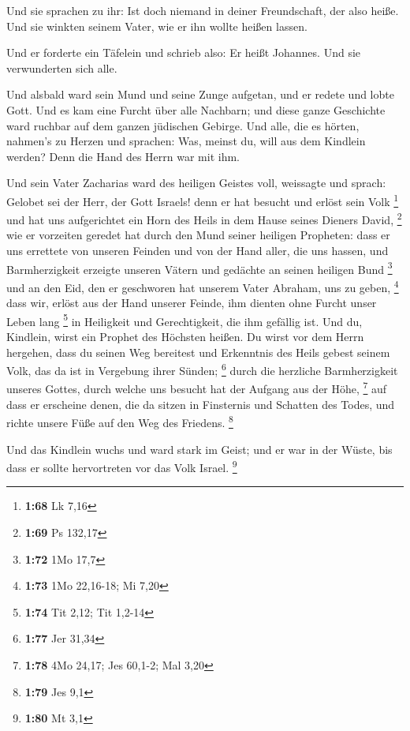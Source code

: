  Und sie sprachen zu ihr: Ist doch niemand in deiner
Freundschaft, der also heiße.  Und sie winkten seinem
Vater, wie er ihn wollte heißen lassen.

 Und er forderte ein Täfelein und schrieb also: Er heißt
Johannes. Und sie verwunderten sich alle.

 Und alsbald ward sein Mund und seine Zunge aufgetan, und
er redete und lobte Gott.  Und es kam eine Furcht über
alle Nachbarn; und diese ganze Geschichte ward ruchbar auf dem ganzen
jüdischen Gebirge.  Und alle, die es hörten, nahmen's zu
Herzen und sprachen: Was, meinst du, will aus dem Kindlein werden? Denn
die Hand des Herrn war mit ihm.

 Und sein Vater Zacharias ward des heiligen Geistes voll,
weissagte und sprach:  Gelobet sei der Herr, der Gott
Israels! denn er hat besucht und erlöst sein Volk \footnote{\textbf{1:68}
  Lk 7,16}  und hat uns aufgerichtet ein Horn des Heils
in dem Hause seines Dieners David, \footnote{\textbf{1:69} Ps 132,17}
 wie er vorzeiten geredet hat durch den Mund seiner
heiligen Propheten:  dass er uns errettete von unseren
Feinden und von der Hand aller, die uns hassen,  und
Barmherzigkeit erzeigte unseren Vätern und gedächte an seinen heiligen
Bund \footnote{\textbf{1:72} 1Mo 17,7}  und an den Eid,
den er geschworen hat unserem Vater Abraham, uns zu geben, \footnote{\textbf{1:73}
  1Mo 22,16-18; Mi 7,20}  dass wir, erlöst aus der Hand
unserer Feinde, ihm dienten ohne Furcht unser Leben lang \footnote{\textbf{1:74}
  Tit 2,12; Tit 1,2-14}  in Heiligkeit und Gerechtigkeit,
die ihm gefällig ist.  Und du, Kindlein, wirst ein
Prophet des Höchsten heißen. Du wirst vor dem Herrn hergehen, dass du
seinen Weg bereitest  und Erkenntnis des Heils gebest
seinem Volk, das da ist in Vergebung ihrer Sünden; \footnote{\textbf{1:77}
  Jer 31,34}  durch die herzliche Barmherzigkeit unseres
Gottes, durch welche uns besucht hat der Aufgang aus der Höhe,
\footnote{\textbf{1:78} 4Mo 24,17; Jes 60,1-2; Mal 3,20} 
auf dass er erscheine denen, die da sitzen in Finsternis und Schatten
des Todes, und richte unsere Füße auf den Weg des Friedens. \footnote{\textbf{1:79}
  Jes 9,1}

 Und das Kindlein wuchs und ward stark im Geist; und er
war in der Wüste, bis dass er sollte hervortreten vor das Volk Israel.
\footnote{\textbf{1:80} Mt 3,1}

